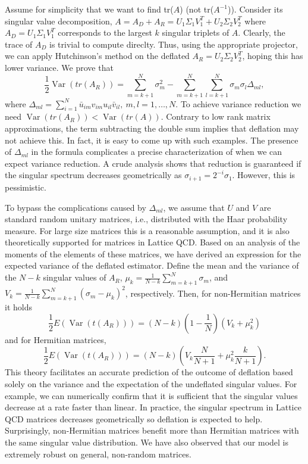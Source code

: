 \documentclass{report}
\begin{document}
Assume for simplicity that we want to find tr($A$) (not tr($A^{-1}$)).
Consider its singular value decomposition,
$A = A_D + A_R = U_1\Sigma_1 V_1^T + U_2\Sigma_2 V_2^T$
where $A_D = U_1\Sigma_1 V_1^T$ corresponds to the largest $k$
singular triplets of $A$.
Clearly, the trace of $A_D$ is trivial to compute direclty.
Thus, using the appropriate projector, we can apply Hutchinson's method
on the deflated $A_R = U_2\Sigma_2 V_2^T$, hoping this has lower variance.
We prove that
$$
\frac{1}{2} \operatorname{Var}(tr(A_R)) = \sum_{m=k+1}^N \sigma_m^2 -
\sum_{m=k+1}^N \sum_{l=k+1}^N \sigma_m \sigma_l \Delta_{ml},
$$
where
$\Delta_{ml} = \sum_{i=1}^N \bar{u}_{im} v_{im} u_{il} \bar{v}_{il}, \
m,l = 1,\ldots ,N.$
To achieve variance reduction we need $\operatorname{Var}(tr(A_R)) <
\operatorname{Var}(tr(A))$.
Contrary to low rank matrix approximations, the term subtracting the double
sum implies that deflation may not achieve this.
In fact, it is easy to come up with such examples.
The presence of $\Delta_{ml}$ in the formula complicates a precise
characterization of when we can expect variance reduction.
A crude analysis shows that reduction is guaranteed if the singular
spectrum decreases geometrically as
$\sigma_{i+1} = 2^{-i}\sigma_1$.
However, this is pessimistic.

To bypass the complications caused by $\Delta_{ml}$,
we assume that $U$ and $V$ are standard random unitary matrices, i.e.,
distributed with the Haar probability measure.
For large size matrices this is a reasonable assumption, and it is also
theoretically supported for matrices in Lattice QCD.
Based on an analysis of the moments of the elements of these matrices, we have
derived an expression for the expected variance of the deflated estimator.
Define the mean and the variance of the $N-k$ singular values of $A_R$,
$\mu_k =\frac{1}{N-k} \sum_{m=k+1}^{N}\sigma_m$, and
$V_k = \frac{1}{N-k} \sum_{m=k+1}^N (\sigma_m - \mu_k)^2$, respectively.
Then, for non-Hermitian matrices it holds
\begin{equation*}
\frac{1}{2} E(\operatorname{Var}(t(A_R))) =
(N-k) (1-\frac{1}{N}) (V_k + \mu_k^2)
\end{equation*}
and for Hermitian matrices,
\begin{equation*}
\frac{1}{2} E(\operatorname{Var}(t(A_R))) =
(N-k)\left( V_k \frac{N}{N+1} + \mu_k^2 \frac{k}{N+1} \right).
\end{equation*}
This theory facilitates an accurate prediction of the outcome of deflation
based solely on the variance and the expectation of the undeflated singular values.
For example, we can numerically confirm that it is sufficient that the singular
values decrease at a rate faster than linear.
In practice, the singular spectrum in Lattice QCD matrices decreases geometrically
so deflation is expected to help.
Surprisingly, non-Hermitian matrices benefit more than Hermitian matrices with
the same singular value distribution.
We have also observed that our model is extremely robust on general, non-random matrices.
\end{document}
